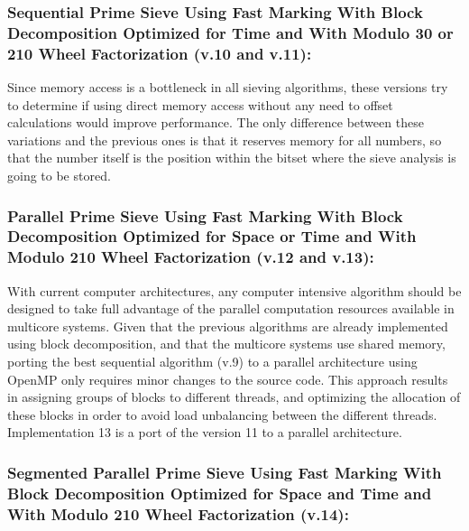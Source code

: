\documentclass[runningheads,a4paper]{llncs}
\begin{document}
\subsubsection{Sequential Prime Sieve Using Fast Marking With Block Decomposition Optimized for Time and With Modulo 30 or 210 Wheel Factorization (v.10 and v.11):}
\label{Sequential Prime Sieve Using Fast Marking With Block Decomposition Optimized for Time and With Modulo 30 Wheel Factorization}

Since memory access is a bottleneck in all sieving algorithms, these versions try to determine if using direct memory access without any need to offset calculations would improve performance. The only difference between these variations and the previous ones is that it reserves memory for all numbers, so that the number itself is the position within the bitset where the sieve analysis is going to be stored.


\subsubsection{Parallel Prime Sieve Using Fast Marking With Block Decomposition Optimized for Space or Time and With Modulo 210 Wheel Factorization (v.12 and v.13):}
\label{Parallel Prime Sieve Using Fast Marking With Block Decomposition Optimized for Space and Time and With Modulo 210 Wheel Factorization}

With current computer architectures, any computer intensive algorithm should be designed to take full advantage of the parallel computation resources available in multicore systems. Given that the previous algorithms are already implemented using block decomposition, and that the multicore systems use shared memory, porting the best sequential algorithm (v.9) to a parallel architecture using OpenMP \cite{dagum1998openmp} only requires minor changes to the source code. This approach results in assigning groups of blocks to different threads, and optimizing the allocation of these blocks in order to avoid load unbalancing between the different threads.
Implementation 13 is a port of the version 11 to a parallel architecture.


\subsubsection{Segmented Parallel Prime Sieve Using Fast Marking With Block Decomposition Optimized for Space and Time and With Modulo 210 Wheel Factorization (v.14):}
\label{Segmented Parallel Prime Sieve Using Fast Marking With Block Decomposition Optimized for Space and Time and With Modulo 210 Wheel Factorization}
\end{document}
